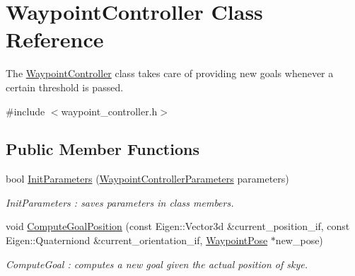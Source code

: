 \hypertarget{class_waypoint_controller}{\section{Waypoint\-Controller Class Reference}
\label{class_waypoint_controller}
}


The \hyperlink{class_waypoint_controller}{Waypoint\-Controller} class takes care of providing new goals whenever a certain threshold is passed.  




{\ttfamily \#include $<$waypoint\-\_\-controller.\-h$>$}

\subsection*{Public Member Functions}
\begin{DoxyCompactItemize}
\item 
bool \hyperlink{class_waypoint_controller_aa05440d8e44108c18d52a60cba938662}{Init\-Parameters} (\hyperlink{struct_waypoint_controller_parameters}{Waypoint\-Controller\-Parameters} parameters)
\begin{DoxyCompactList}\small\item\em Init\-Parameters \-: saves parameters in class members. \end{DoxyCompactList}\item 
void \hyperlink{class_waypoint_controller_af1e350a0e839cf98de1abefa54544b92}{Compute\-Goal\-Position} (const Eigen\-::\-Vector3d \&current\-\_\-position\-\_\-if, const Eigen\-::\-Quaterniond \&current\-\_\-orientation\-\_\-if, \hyperlink{struct_waypoint_pose}{Waypoint\-Pose} $\ast$new\-\_\-pose)
\begin{DoxyCompactList}\small\item\em Compute\-Goal \-: computes a new goal given the actual position of skye. \end{DoxyCompactList}\end{DoxyCompactItemize}
